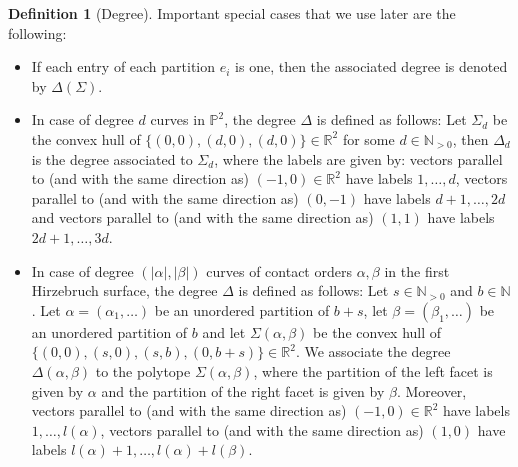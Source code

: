 \documentclass[11pt,reqno,a4]{amsart}
\theoremstyle{dotless}
\theoremstyle{definition}
\newtheorem{definition}[corollary]{Definition}
\begin{document}
\begin{definition}[Degree]
Important special cases that we use later are the following:
\begin{itemize}
\item
If each entry of each partition $e_i$ is one, then the associated degree is denoted by $\Delta(\Sigma)$.
\item
In case of degree $d$ curves in $\mathbb{P}^2$, the degree $\Delta$ is defined as follows:
Let $\Sigma_d$ be the convex hull of $\lbrace (0,0),(d,0),(d,0)\rbrace\in\mathbb{R}^2$ for some $d\in\mathbb{N}_{>0}$, then $\Delta_d$ is the degree associated to $\Sigma_d$, where the labels are given by: vectors parallel to (and with the same direction as) $(-1,0)\in\mathbb{R}^2$ have labels $1,\dots,d$, vectors parallel to (and with the same direction as) $(0,-1)$ have labels $d+1,\dots,2d$ and vectors parallel to (and with the same direction as) $(1,1)$ have labels $2d+1,\dots,3d$.
\item
In case of degree $(|\alpha|,|\beta|)$ curves of contact orders $\alpha,\beta$ in the first Hirzebruch surface, the degree $\Delta$ is defined as follows:
Let $s\in\mathbb{N}_{>0}$ and $b\in\mathbb{N}$. Let $\alpha=(\alpha_1,\dots)$ be an unordered partition of $b+s$, let $\beta=(\beta_1,\dots)$ be an unordered partition of $b$ and let $\Sigma(\alpha,\beta)$ be the convex hull of $\lbrace (0,0),(s,0),(s,b),(0,b+s)\rbrace\in\mathbb{R}^2$. We associate the degree $\Delta\left(\alpha,\beta\right)$ to the polytope $\Sigma(\alpha,\beta)$, where the partition of the left facet is given by $\alpha$ and the partition of the right facet is given by $\beta$. Moreover, vectors parallel to (and with the same direction as) $(-1,0)\in\mathbb{R}^2$ have labels $1,\dots, l(\alpha)$, vectors parallel to (and with the same direction as) $(1,0)$ have labels $l(\alpha)+1,\dots,l(\alpha)+l(\beta)$.
\end{itemize}

\end{definition}
\end{document}
